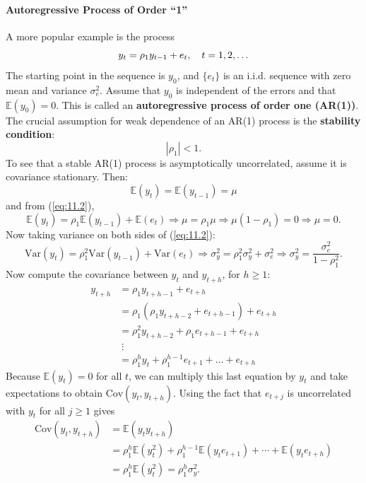 \documentclass[a4paper, 10pt]{article}
\theoremstyle{definition}	%
\begin{document}
\paragraph{Autoregressive Process of Order “1”} A more popular example is the process
\begin{equation}
y_t = \rho_1 y_{t-1} + \\e_t, \quad t = 1, 2, \ldots \label{eq:11.2}
\end{equation}
The starting point in the sequence is \( y_0 \), and \( \{ e_t \} \) is an i.i.d. sequence with zero mean and variance \( \sigma_e^2 \). Assume that \( y_0 \) is independent of the errors and that \( \mathbb{E}(y_0) = 0 \). This is called an \textbf{autoregressive process of order one (AR(1))}.
The crucial assumption for weak dependence of an AR(1) process is the \textbf{stability condition}:
\[
|\rho_1| < 1.
\]
To see that a stable AR(1) process is asymptotically uncorrelated, assume it is covariance stationary. Then:
\[
\mathbb{E}(y_t) = \mathbb{E}(y_{t-1}) = \mu
\]
and from (\ref{eq:11.2}),
\[
\mathbb{E}(y_t) = \rho_1 \mathbb{E}(y_{t-1}) + \mathbb{E}(e_t)
\Rightarrow \mu = \rho_1 \mu \Rightarrow \mu(1 - \rho_1) = 0 \Rightarrow \mu = 0.
\]
Now taking variance on both sides of (\ref{eq:11.2}):
\begin{equation}
\text{Var}(y_t) = \rho_1^2 \text{Var}(y_{t-1}) + \text{Var}(e_t)
\Rightarrow \sigma_y^2 = \rho_1^2 \sigma_y^2 + \sigma_e^2
\Rightarrow \sigma_y^2 = \frac{\sigma_e^2}{1 - \rho_1^2}.
 \label{eq:11.3}
\end{equation}
Now compute the covariance between \( y_t \) and \( y_{t+h} \), for \( h \geq 1 \):
\begin{align*}
y_{t+h} &= \rho_1 y_{t+h-1} + e_{t+h} \\
       &= \rho_1 (\rho_1 y_{t+h-2} + e_{t+h-1}) + e_{t+h} \\
       &= \rho_1^2 y_{t+h-2} + \rho_1 e_{t+h-1} + e_{t+h} \\
       &\;\vdots \\
       &= \rho_1^h y_t + \rho_1^{h-1} e_{t+1} + \dots + e_{t+h}
\end{align*}
Because \( \mathbb{E}(y_t) = 0 \) for all \( t \), we can multiply this last equation by \( y_t \) and take expectations to obtain \( \text{Cov}(y_t, y_{t+h}) \). Using the fact that \( e_{t+j} \) is uncorrelated with \( y_t \) for all \( j \geq 1 \) gives
\begin{align*}
\text{Cov}(y_t, y_{t+h}) &= \mathbb{E}(y_t y_{t+h}) \\
&= \rho_1^h \mathbb{E}(y_t^2) + \rho_1^{h-1} \mathbb{E}(y_t e_{t+1}) + \cdots + \mathbb{E}(y_t e_{t+h}) \\
&= \rho_1^h \mathbb{E}(y_t^2) = \rho_1^h \sigma_y^2.
\end{align*}
\end{document}
